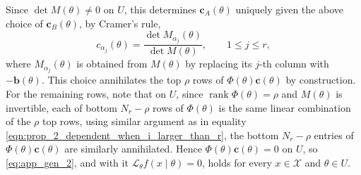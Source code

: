 \documentclass[11pt,twoside]{article} %
\begin{document}
Since $\det M(\theta)\ne0$ on $U$, this determines $\mathbf c_A(\theta)$ uniquely given the above choice of
$\mathbf c_B(\theta)$, by Cramer's rule,
\begin{equation*}
    c_{\alpha_j}(\theta)=\frac{\det M_{\alpha_j}(\theta)}{\det M(\theta)},\qquad 1\le j\le r,
\end{equation*}
where $M_{\alpha_j}(\theta)$ is obtained from $M(\theta)$ by replacing its $j$-th column with
$-\mathbf b(\theta)$. This choice annihilates the top $\rho$ rows of $\Phi(\theta)\mathbf c(\theta)$ by
construction. For the remaining rows, note that on $U$, since $\operatorname{rank}\Phi(\theta)=\rho$ and
$M(\theta)$ is invertible, each of bottom $N_r - \rho$ rows %
of $\Phi(\theta)$
is the same linear combination of the $\rho$
top rows, using similar argument as in equality \eqref{eqn:prop_2_dependent_when_i_larger_than_r}, the bottom $N_r - \rho$ entries of $\Phi(\theta)\mathbf{c}(\theta)$ are   similarly annihilated. Hence $\Phi(\theta)\mathbf c(\theta)=0$ on $U$, so \eqref{eq:app_gen_2}, and with it
$\mathcal L_\theta f(x\mid\theta)=0$, holds for every $x\in\mathcal X$ and $\theta\in U$.
\end{document}
